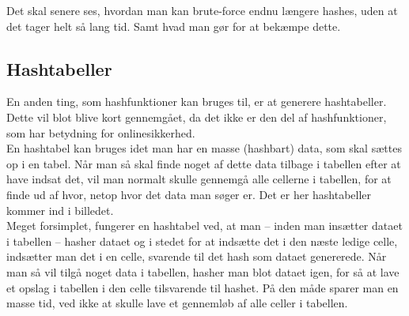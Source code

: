 Det skal senere ses, hvordan man kan brute-force endnu længere hashes, uden at det tager helt så lang tid.
Samt hvad man gør for at bekæmpe dette.

\subsection{Hashtabeller}
En anden ting, som hashfunktioner kan bruges til, er at generere hashtabeller.
Dette vil blot blive kort gennemgået, da det ikke er den del af hashfunktioner, som har betydning for onlinesikkerhed.\\
En hashtabel kan bruges idet man har en masse (hashbart) data, som skal sættes op i en tabel.
Når man så skal finde noget af dette data tilbage i tabellen efter at have indsat det, vil man normalt skulle gennemgå alle cellerne i tabellen, for at finde ud af hvor, netop hvor det data man søger er. Det er her hashtabeller kommer ind i billedet.\\
Meget forsimplet, fungerer en hashtabel ved, at man -- inden man insætter dataet i tabellen -- hasher dataet og i stedet for at indsætte det i den næste ledige celle, indsætter man det i en celle, svarende til det hash som dataet genererede.
Når man så vil tilgå noget data i tabellen, hasher man blot dataet igen, for så at lave et opslag i tabellen i den celle tilsvarende til hashet. På den måde sparer man en masse tid, ved ikke at skulle lave et gennemløb af alle celler i tabellen.\cite{hashtables}
